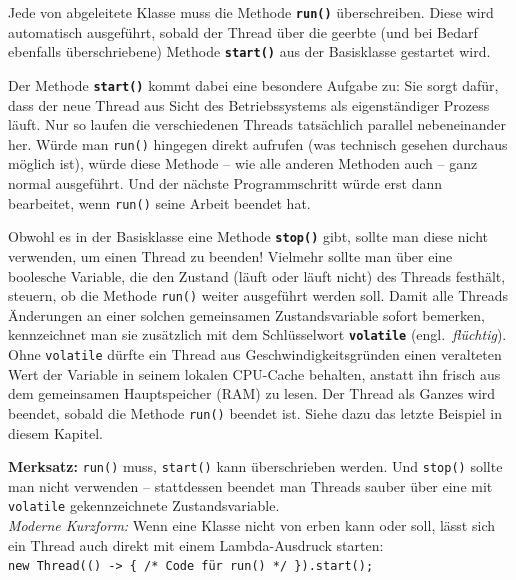 Jede von  abgeleitete Klasse muss die Methode \textbf{\texttt{run()}}
überschreiben. Diese wird automatisch ausgeführt, sobald der Thread über die
geerbte (und bei Bedarf ebenfalls überschriebene) Methode
\textbf{\texttt{start()}} aus der Basisklasse  gestartet
wird.

Der Methode \textbf{\texttt{start()}} kommt dabei eine besondere Aufgabe zu:
Sie sorgt dafür, dass der neue Thread aus Sicht des Betriebssystems als
eigenständiger Prozess läuft. Nur so laufen die verschiedenen Threads
tatsächlich parallel nebeneinander her. Würde man \lstinline|run()| hingegen
direkt aufrufen (was technisch gesehen durchaus möglich ist), würde diese
Methode -- wie alle anderen Methoden auch -- ganz normal ausgeführt. Und der
nächste Programmschritt würde erst dann bearbeitet, wenn \lstinline|run()| seine
Arbeit beendet hat.

Obwohl es in der Basisklasse  eine Methode
\textbf{\texttt{stop()}} gibt, sollte man diese nicht verwenden, um einen
Thread zu beenden! Vielmehr sollte man über eine boolesche Variable, die den
Zustand (läuft oder läuft nicht) des Threads festhält, steuern, ob die Methode
\lstinline|run()| weiter ausgeführt werden soll. Damit alle Threads Änderungen
an einer solchen gemeinsamen Zustandsvariable sofort bemerken, kennzeichnet man
sie zusätzlich mit dem Schlüsselwort \textbf{\texttt{volatile}} (engl.\
\emph{flüchtig}). Ohne \lstinline|volatile| dürfte ein Thread aus
Geschwindigkeitsgründen einen veralteten Wert der Variable in seinem lokalen
CPU-Cache behalten, anstatt ihn frisch aus dem gemeinsamen Hauptspeicher (RAM)
zu lesen. Der Thread als Ganzes wird beendet, sobald die Methode
\lstinline|run()| beendet ist. Siehe dazu das letzte Beispiel in diesem Kapitel.

\begin{center}
\begin{minipage}{1.0\textwidth}
\begin{framed}
\textbf{Merksatz:} \texttt{run()} muss, \texttt{start()} kann
überschrieben werden. Und \texttt{stop()} sollte man nicht verwenden --
stattdessen beendet man Threads sauber über eine mit \texttt{volatile}
gekennzeichnete Zustandsvariable.\\[1mm]
\emph{Moderne Kurzform:} Wenn eine Klasse nicht von  erben kann
oder soll, lässt sich ein Thread auch direkt mit einem Lambda-Ausdruck starten:\\
\texttt{new Thread(() -> \{ /* Code für run() */ \}).start();}
\end{framed}
\end{minipage}
\end{center}
